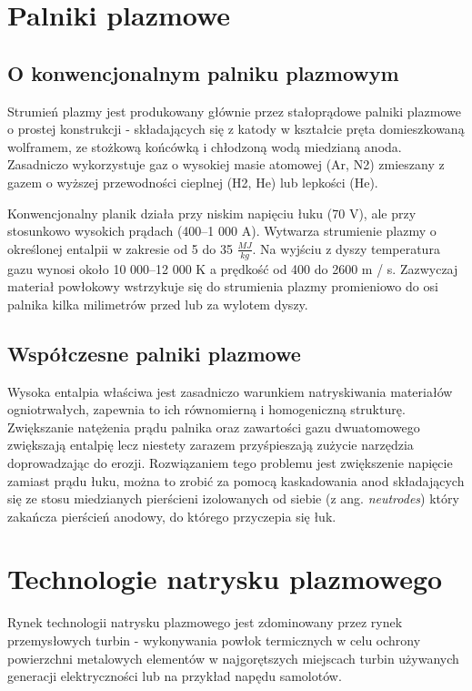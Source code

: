 \documentclass[13pt]{article}
\begin{document}

\section{Palniki plazmowe}
\subsection{O konwencjonalnym palniku plazmowym}
Strumień plazmy jest produkowany głównie przez stałoprądowe palniki plazmowe o prostej konstrukcji - składających się z katody w kształcie pręta domieszkowaną wolframem, ze stożkową końcówką i chłodzoną wodą miedzianą anoda. Zasadniczo wykorzystuje gaz o wysokiej masie atomowej (Ar, N2) zmieszany z
gazem o wyższej przewodności cieplnej (H2, He) lub lepkości (He).

Konwencjonalny planik działa przy niskim napięciu łuku (70 V), ale przy stosunkowo wysokich prądach
(400–1 000 A). Wytwarza strumienie plazmy o określonej entalpii w zakresie od 5 do 35 $\frac{MJ}{kg}$. Na wyjściu z dyszy temperatura gazu wynosi około 10 000–12 000 K a prędkość
od 400 do 2600 m / s. Zazwyczaj materiał powłokowy wstrzykuje się do strumienia plazmy
promieniowo do osi palnika kilka milimetrów przed lub za wylotem dyszy.
\cite{persp}

\newpage

\subsection{Współczesne palniki plazmowe}
Wysoka entalpia właściwa jest zasadniczo warunkiem natryskiwania materiałów ogniotrwałych, zapewnia to ich równomierną i homogeniczną strukturę. Zwiększanie natężenia prądu palnika oraz zawartości gazu dwuatomowego zwiększają entalpię lecz niestety zarazem przyśpieszają zużycie narzędzia doprowadzając do erozji. Rozwiązaniem tego problemu jest zwiększenie napięcie zamiast prądu łuku, można to zrobić za pomocą
kaskadowania anod składających się ze stosu miedzianych pierścieni izolowanych od siebie (z ang. \textit{neutrodes}) który zakańcza pierścień anodowy, do którego przyczepia się łuk.

\section{Technologie natrysku plazmowego}
Rynek technologii natrysku plazmowego jest zdominowany przez rynek przemysłowych turbin - wykonywania powłok termicznych w celu ochrony powierzchni metalowych elementów w najgorętszych miejscach turbin używanych generacji elektryczności lub na przykład napędu samolotów.
\end{document}
